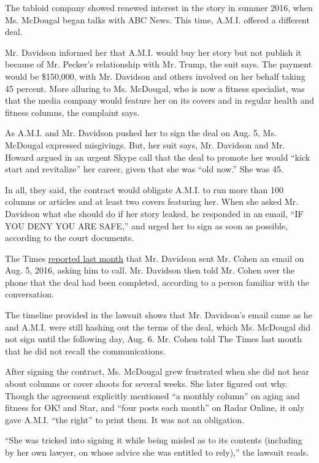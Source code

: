 The tabloid company showed renewed interest in the story in summer 2016,
when Ms. McDougal began talks with ABC News. This time, A.M.I. offered a
different deal.

Mr. Davidson informed her that A.M.I. would buy her story but not
publish it because of Mr. Pecker's relationship with Mr. Trump, the suit
says. The payment would be \$150,000, with Mr. Davidson and others
involved on her behalf taking 45 percent. More alluring to Ms. McDougal,
who is now a fitness specialist, was that the media company would
feature her on its covers and in regular health and fitness columns, the
complaint says.

As A.M.I. and Mr. Davidson pushed her to sign the deal on Aug. 5, Ms.
McDougal expressed misgivings. But, her suit says, Mr. Davidson and Mr.
Howard argued in an urgent Skype call that the deal to promote her would
``kick start and revitalize'' her career, given that she was ``old
now.'' She was 45.

In all, they said, the contract would obligate A.M.I. to run more than
100 columns or articles and at least two covers featuring her. When she
asked Mr. Davidson what she should do if her story leaked, he responded
in an email, ``IF YOU DENY YOU ARE SAFE,'' and urged her to sign as soon
as possible, according to the court documents.

The Times
\href{https://www.nytimes3xbfgragh.onion/2018/02/18/us/politics/michael-cohen-trump.html}{reported
last month} that Mr. Davidson sent Mr. Cohen an email on Aug. 5, 2016,
asking him to call. Mr. Davidson then told Mr. Cohen over the phone that
the deal had been completed, according to a person familiar with the
conversation.

The timeline provided in the lawsuit shows that Mr. Davidson's email
came as he and A.M.I. were still hashing out the terms of the deal,
which Ms. McDougal did not sign until the following day, Aug. 6. Mr.
Cohen told The Times last month that he did not recall the
communications.

After signing the contract, Ms. McDougal grew frustrated when she did
not hear about columns or cover shoots for several weeks. She later
figured out why. Though the agreement explicitly mentioned ``a monthly
column'' on aging and fitness for OK! and Star, and ``four posts each
month'' on Radar Online, it only gave A.M.I. ``the right'' to print
them. It was not an obligation.

``She was tricked into signing it while being misled as to its contents
(including by her own lawyer, on whose advice she was entitled to
rely),'' the lawsuit reads.

